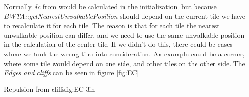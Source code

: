 	
	Normally \textit{dc} from  would be calculated in the initialization, but because \\ \textit{BWTA::getNearestUnwalkablePosition} should depend on the current tile we have to recalculate it for each tile. The reason is that for each tile the nearest unwalkable position can differ, and we need to use the same unwalkable position in the calculation of the center tile. If we didn't do this, there could be cases where 
	we took the wrong tiles into consideration. An example could be a corner, where some tile would depend on one side, and other tiles on the other side. 
	The \textit{Edges and cliffs} can be seen in figure \ref{fig:EC}

			{Repulsion from cliffs}{fig:EC}{-3in}

